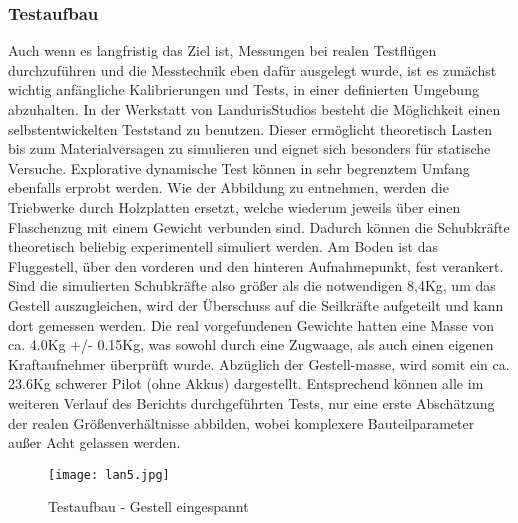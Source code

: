\clearpage
\subsubsection{Testaufbau}
Auch wenn es langfristig das Ziel ist, Messungen bei realen Testflügen durchzuführen und die Messtechnik eben dafür ausgelegt wurde,
ist es zunächst wichtig anfängliche Kalibrierungen und Tests, in einer definierten Umgebung abzuhalten.
In der Werkstatt von LandurisStudios besteht die Möglichkeit einen selbstentwickelten Teststand zu benutzen.
Dieser ermöglicht theoretisch Lasten bis zum Materialversagen zu simulieren und eignet sich besonders für statische Versuche.
Explorative dynamische Test können in sehr begrenztem Umfang ebenfalls erprobt werden.   Wie der Abbildung zu entnehmen, werden die Triebwerke durch Holzplatten ersetzt,
welche wiederum jeweils über einen Flaschenzug mit einem Gewicht verbunden sind. Dadurch können die Schubkräfte theoretisch beliebig experimentell simuliert werden.
Am Boden ist das Fluggestell, über den vorderen und den hinteren Aufnahmepunkt, fest verankert. Sind die simulierten Schubkräfte also größer als die notwendigen 8,4Kg,
um das Gestell auszugleichen, wird der Überschuss auf die Seilkräfte aufgeteilt und kann dort gemessen werden.
Die real vorgefundenen Gewichte hatten eine Masse von ca. 4.0Kg +/- 0.15Kg, was sowohl durch eine Zugwaage, als auch einen eigenen Kraftaufnehmer überprüft wurde.
Abzüglich der Gestell-masse, wird somit ein ca. 23.6Kg schwerer Pilot (ohne Akkus) dargestellt. Entsprechend können alle im weiteren Verlauf des Berichts durchgeführten Tests,
nur eine erste Abschätzung der realen Größenverhältnisse abbilden, wobei komplexere Bauteilparameter außer Acht gelassen werden.
\begin{figure}[htbp]
    \begin{center}
        \texttt{[image: lan5.jpg]}
        \caption[Testaufbau - Gestell eingespannt (Abbildungsverzeichnis)]{Testaufbau - Gestell eingespannt}
        
        \label{fig:lan5}
    \end{center}
\end{figure}

